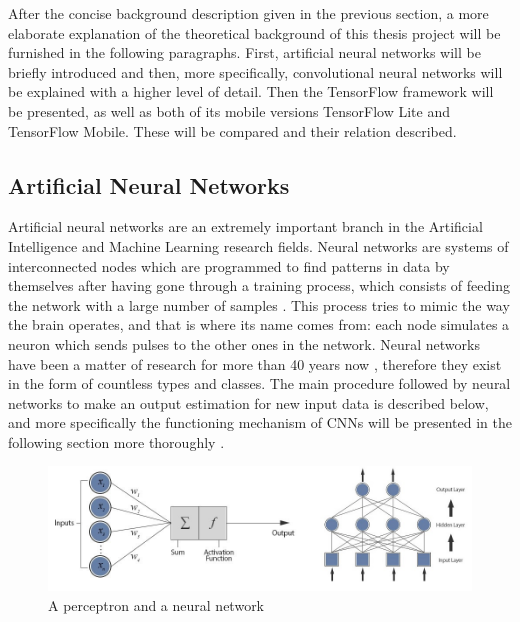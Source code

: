 After the concise background description given in the previous section, a more elaborate explanation of the theoretical background of this thesis project will be furnished in the following paragraphs. First, artificial neural networks will be briefly introduced and then, more specifically, convolutional neural networks will be explained with a higher level of detail. Then the TensorFlow framework will be presented, as well as both of its mobile versions TensorFlow Lite and TensorFlow Mobile. These will be compared and their relation described.

\subsection{Artificial Neural Networks}
Artificial neural networks are an extremely important branch in the Artificial Intelligence and Machine Learning research fields. Neural networks are systems of interconnected nodes which are programmed to find patterns in data by themselves after having gone through a training process, which consists of feeding the network with a large number of samples \cite{omidvar1997neural}. This process tries to mimic the way the brain operates, and that is where its name comes from: each node simulates a neuron which sends pulses to the other ones in the network.
Neural networks have been a matter of research for more than 40 years now \cite{hopfield1982}, therefore they exist in the form of countless types and classes. The main procedure followed by neural networks to make an output estimation for new input data is described below, and more specifically the functioning mechanism of CNNs will be presented in the following section more thoroughly \cite{hopfield1982}. \\

%

\begin{figure}[h!]
  \includegraphics[width=\linewidth]{img/mix.jpeg}
  \caption{\small A perceptron and a neural network}
  \label{fig:mix}
\end{figure}
 
